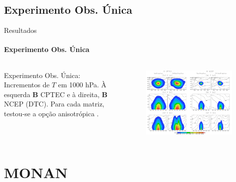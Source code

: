 \documentclass[10pt,aspectratio=169]{beamer}
\begin{document}
\subsection{Experimento Obs. Única}

\begin{frame}[fragile]{Resultados}
\framesubtitle{Experimento Obs. Única}
	\vspace{-2.5em}
	\begin{columns}
    \begin{column}{0.35\textwidth} 
		  \vspace{-3.75em}
			\begin{block}{Experimento Obs. Única:}
			  \vspace{0.5em}
				Incrementos de $T$ em 1000 hPa. À esquerda $\mathbf{B}$ CPTEC e à direita, $\mathbf{B}$ NCEP (DTC). Para cada matriz, testou-se a opção anisotrópica \cite{bastarz/2017}.
		  \end{block}
		\end{column}
		\hspace*{2em}
		\begin{column}{0.5\textwidth}
      \begin{figure}[H]
        \centering
		    \hspace*{-5.5em}\includegraphics[trim={0 0 0 2.5cm},clip,scale=0.175]{./figs/fig5.pdf}
				\caption{}
			\end{figure}
		\end{column}
	\end{columns}
\end{frame}

\section{MONAN}
\end{document}
